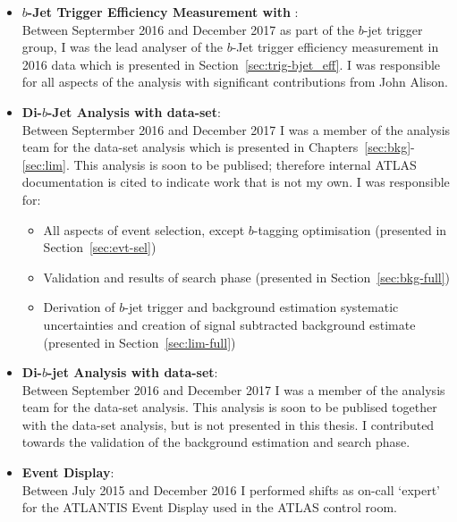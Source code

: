 \begin{itemize}[leftmargin=*]
\begin{itemize}
  \end{itemize}
  \vspace{1em}
\item\textbf{$b$-Jet Trigger Efficiency Measurement  with \lm{}}:\\
  Between Septermber 2016 and December 2017 as part of the $b$-jet trigger group,
  I was the lead analyser of the $b$-Jet trigger efficiency measurement in 2016 data which is presented in Section~\ref{sec:trig-bjet_eff}.
  I was responsible for all aspects of the analysis with significant contributions from John Alison. 
\item\textbf{Di-$b$-Jet Analysis  with \lm{} data-set}:\\ 
  Between Septermber 2016 and December 2017 I was a member of the analysis team for the \lm{} data-set analysis
  which is presented in Chapters~\ref{sec:bkg}-\ref{sec:lim}.
  This analysis is soon to be publised; therefore internal ATLAS documentation is cited to indicate work that is not my own.
  I was responsible for:
  \begin{itemize}
    \item All aspects of event selection, except $b$-tagging optimisation (presented in Section~\ref{sec:evt-sel})
    \item Validation and results of search phase (presented in Section~\ref{sec:bkg-full})
    \item Derivation of $b$-jet trigger and background estimation systematic uncertainties and
      creation of signal subtracted background estimate (presented in Section~\ref{sec:lim-full})
  \end{itemize}
  \vspace{1em}
\item\textbf{Di-$b$-jet Analysis  with \hm{} data-set}: \\
  Between September 2016 and December 2017 I was a member of the analysis team for the \hm{} data-set analysis.
  This analysis is soon to be publised together with the \lm{} data-set analysis, but is not presented in this thesis.
  I contributed towards the validation of the background estimation and search phase.\vspace{1em}
\item\textbf{Event Display}: \\
  Between July 2015 and December 2016 I performed shifts as on-call `expert' for the {\sc ATLANTIS} Event Display used in the ATLAS control room.
\end{itemize}







